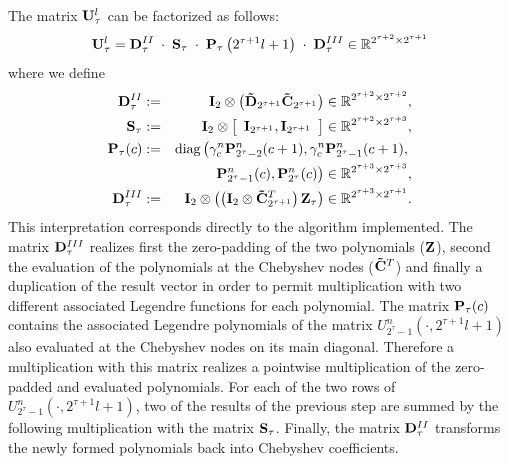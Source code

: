 The matrix $\mathbf{U}_{\tau}^l$ can be factorized as follows:
$$ \mathbf{U}_{\tau}^l = \mathbf{D}_{\tau}^{II} \; \cdot \; \mathbf{S}_{\tau} \; \cdot \; \mathbf{P}_{\tau}\left(2^{\tau + 1}l+1\right) \; \cdot \; \mathbf{D}_{\tau}^{III}  \in \mathbb{R}^{2^{\tau+2} \times 2^{\tau+1}}$$
where we define
\begin{eqnarray*}
  \mathbf{D}_{\tau}^{II} & := & \mathbf{I}_{2} \otimes \left(\mathbf{\tilde{D}}_{2^{\tau+1}} \mathbf{\tilde{C}}_{2^{\tau+1}}\right) \in \mathbb{R}^{2^{\tau+2} \times 2^{\tau+2}},\\
  \mathbf{S}_{\tau} & := & \mathbf{I}_2 \otimes \left[\begin{array}{cc}\mathbf{I}_{2^{\tau+1}},\mathbf{I}_{2^{\tau+1}}\end{array}\right] \in \mathbb{R}^{2^{\tau+2} \times 2^{\tau+3}},\\
  \mathbf{P}_{\tau}(c) & := & \text{diag}\left(\gamma_{c}^n \mathbf{P}_{2^{\tau}-2}^n(c+1),\gamma_{c}^n \mathbf{P}_{2^{\tau}-1}^n(c+1),\right.\\
    & & \left. \mathbf{P}_{2^{\tau}-1}^n(c), \mathbf{P}_{2^{\tau}}^n(c)\right) \in \mathbb{R}^{2^{\tau+3} \times 2^{\tau+3}},\\
  \mathbf{D}_{\tau}^{III} & := &\mathbf{I}_{2} \otimes \left(\left(\mathbf{I}_{2} \otimes \mathbf{\tilde{C}}^T_{2^{\tau+1}}\right)\mathbf{Z}_{\tau}\right) \in \mathbb{R}^{2^{\tau+3} \times 2^{\tau+1}}.
\end{eqnarray*}   
This interpretation corresponds directly to the algorithm implemented. The matrix $\mathbf{D}_{\tau}^{III}$ realizes first the zero-padding of the two polynomials ($\mathbf{Z}$), second the evaluation of the polynomials at the Chebyshev nodes ($\mathbf{\tilde{C}}^T$) and finally a duplication of the result vector in order to permit multiplication with two different associated Legendre functions for each polynomial. The matrix $\mathbf{P}_{\tau}(c)$ contains the associated Legendre polynomials of the matrix $U_{2^{\tau}-1}^n(\cdot,2^{\tau+1}l+1)$ also evaluated at the Chebyshev nodes on its main diagonal. Therefore a multiplication with this matrix realizes a pointwise multiplication of the zero-padded and evaluated polynomials. For each of the two rows of $U_{2^{\tau}-1}^n(\cdot,2^{\tau+1}l+1)$, two of the results of the previous step are summed by the following multiplication with the matrix $\mathbf{S}_{\tau}$. Finally, the matrix $\mathbf{D}_{\tau}^{II}$ transforms the newly formed polynomials back into Chebyshev coefficients.

